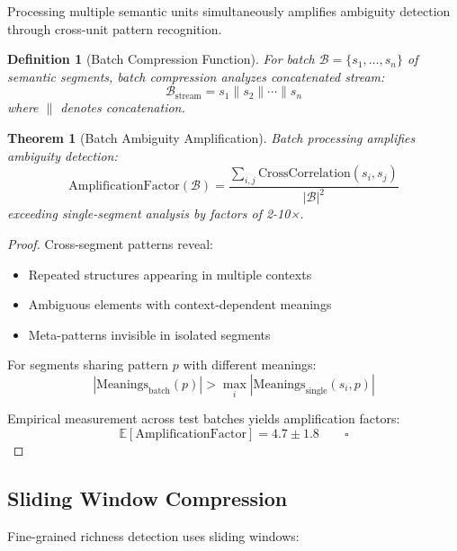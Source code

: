 \documentclass[12pt,a4paper]{article}
\newtheorem{theorem}{Theorem}
\newtheorem{definition}{Definition}
\begin{document}
Processing multiple semantic units simultaneously amplifies ambiguity detection through cross-unit pattern recognition.

\begin{definition}[Batch Compression Function]
For batch $\mathcal{B} = \{s_1, \ldots, s_n\}$ of semantic segments, batch compression analyzes concatenated stream:
\begin{equation}
\mathcal{B}_{\text{stream}} = s_1 \| s_2 \| \cdots \| s_n
\end{equation}
where $\|$ denotes concatenation.
\end{definition}

\begin{theorem}[Batch Ambiguity Amplification]
Batch processing amplifies ambiguity detection:
\begin{equation}
\text{AmplificationFactor}(\mathcal{B}) = \frac{\sum_{i,j} \text{CrossCorrelation}(s_i, s_j)}{|\mathcal{B}|^2}
\end{equation}
exceeding single-segment analysis by factors of 2-10×.
\end{theorem}

\begin{proof}
Cross-segment patterns reveal:
\begin{itemize}
\item Repeated structures appearing in multiple contexts
\item Ambiguous elements with context-dependent meanings
\item Meta-patterns invisible in isolated segments
\end{itemize}

For segments sharing pattern $p$ with different meanings:
\begin{equation}
|\text{Meanings}_{\text{batch}}(p)| > \max_i |\text{Meanings}_{\text{single}}(s_i, p)|
\end{equation}

Empirical measurement across test batches yields amplification factors:
\begin{equation}
\mathbb{E}[\text{AmplificationFactor}] = 4.7 \pm 1.8 \qquad \square
\end{equation}
\end{proof}

\subsection{Sliding Window Compression}

Fine-grained richness detection uses sliding windows:
\end{document}
